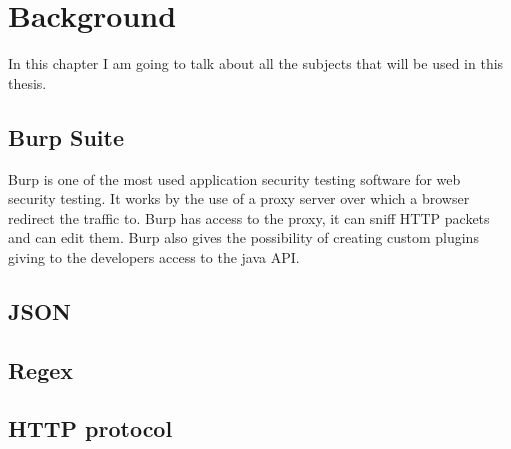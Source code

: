 \printglossary

\chapter{Background}
In this chapter I am going to talk about all the subjects that will be used in this thesis.

\section{Burp Suite}
Burp is one of the most used application security testing software for web security testing. It works by the use of a proxy server over which a browser redirect the traffic to. Burp has access to the proxy, it can sniff HTTP packets and can edit them. Burp also gives the possibility of creating custom plugins giving to the developers access to the java API.

\section{JSON}


\section{Regex}


\section{HTTP protocol}




